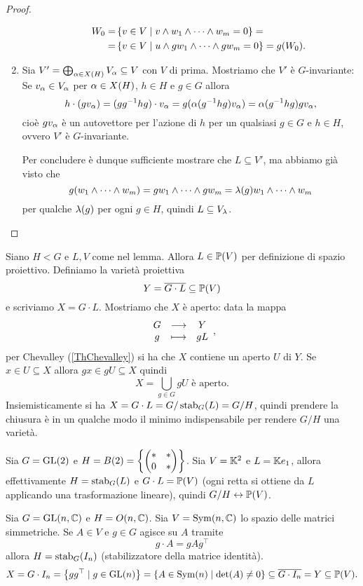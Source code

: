 \begin{proof}
\begin{enumerate}
\begin{itemize}
\begin{align*}
    W_0=&\left\{{v\in V\mid v\wedge w_1\wedge\cdots\wedge w_m=0}\right\}=\\
    =&\left\{{v\in V\mid u\wedge gw_1\wedge\cdots\wedge gw_m=0}\right\}=g(W_0).
\end{align*}
\end{itemize}
\setlength{\leftmargini}{0.5cm}
\item Sia $V'=\bigoplus_{\alpha\in X(H)} V_\alpha\subseteq V$ con $V$ di prima. Mostriamo che $V'$ \`e $G$-invariante:
Se $v_\alpha\in V_\alpha$ per $\alpha\in X(H)$, $h\in H$ e $g\in G$ allora
\[h\cdot(g v_\alpha)=(gg^{-1} h g)\cdot v_\alpha=g(\alpha(g^{-1} hg)v_\alpha)=\alpha(g^{-1} hg)gv_\alpha,\]
cio\`e $gv_\alpha$ \`e un autovettore per l'azione di $h$ per un qualsiasi $g\in G$ e $h\in H$, ovvero $V'$ \`e $G$-invariante. 

Per concludere \`e dunque sufficiente mostrare che $L\subseteq V'$, ma abbiamo gi\`a visto che 
\[g(w_1\wedge\cdots \wedge w_m)=gw_1\wedge\cdots \wedge gw_m=\lambda(g) w_1\wedge\cdots\wedge w_m\] 
per qualche $\lambda(g)$ per ogni $g\in H$, quindi $L\subseteq V_\lambda$.
\end{enumerate}
\setlength{\leftmargini}{0.5cm}
\end{proof}

Siano $H< G$ e $L,V$ come nel lemma. Allora $L\in \mathbb{P}(V)$ per definizione di spazio proiettivo. Definiamo la variet\`a proiettiva
\[Y=\overline{G\cdot L}\subseteq \mathbb{P}(V)\]
e scriviamo $X=G\cdot L$. Mostriamo che $X$ \`e aperto: data la mappa
\[\begin{array}{ccc} {G} & \longrightarrow & {Y}\\ {g} & \longmapsto & {gL} \end{array},\]
per Chevalley (\ref{ThChevalley}) si ha che $X$ contiene un aperto $U$ di $Y$. Se $x\in U\subseteq X$ allora $gx\in gU\subseteq X$ quindi
\[X=\bigcup_{g\in G}gU\text{ \`e aperto.}\]
Insiemisticamente si ha $X=G\cdot L=G/\operatorname{stab}_G(L)=G/H$, quindi prendere la chiusura \`e in un qualche modo il minimo indispensabile per rendere $G/H$ una variet\`a.


\begin{exercise}
Sia $G=\mathrm{GL}(2)$ e $H=B(2)=\left\{{\begin{pmatrix}\ast&\ast\\0&\ast\end{pmatrix}}\right\}$. Sia $V=\mathbb{K}^2$ e $L=\mathbb{K} e_1$, allora effettivamente $H=\operatorname{stab}_G(L)$ e $G\cdot L=\mathbb{P}(V)$ (ogni retta si ottiene da $L$ applicando una trasformazione lineare), quindi $G/H\leftrightarrow \mathbb{P}(V)$.
\end{exercise}

\begin{exercise}
Sia $G=\mathrm{GL}(n,\mathbb{C})$ e $H=O(n,\mathbb{C})$. Sia $V=\operatorname{Sym}(n,\mathbb{C})$ lo spazio delle matrici simmetriche. Se $A\in V$ e $g\in G$ agisce su $A$ tramite 
\[g\cdot A=gA g^\top\]
allora $H=\operatorname{stab}_G(I_n)$ (stabilizzatore della matrice identit\`a).
\[X=G\cdot I_n=\left\{{gg^\top\mid g\in \mathrm{GL}(n)}\right\}=\left\{{A\in \operatorname{Sym}(n)\mid \det(A)\neq 0}\right\}\subseteq\overline{G\cdot I_n}=Y\subseteq \mathbb{P}(V).\]
\end{exercise}

